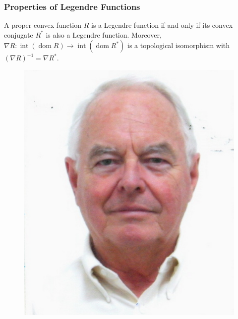 \documentclass[aspectratio=169,xcolor=dvipsnames,11pt]{beamer}
\begin{document}
\begin{frame}\frametitle{Properties of Legendre Functions}


\begin{minipage}{0.7\textwidth}
\begin{theorem}[Rockafellar (1967)]
\label{thm:Rockafellar}
A proper convex function $R$ is a Legendre function if and only if its convex conjugate $R^\ast$ is also a Legendre function.
Moreover, $\nabla R \colon \operatorname{int}(\operatorname{dom} R) \to \operatorname{int}(\operatorname{dom} R^*)$ is a topological isomorphism with $(\nabla R)^{-1} = \nabla R^\ast$.
\end{theorem}
\end{minipage}\hfill
\begin{minipage}{0.3\linewidth}
 \centering
 \begin{figure}
  \centering\vspace{1ex}
  \begin{minipage}[b]{0.6\textwidth}
    \includegraphics[width=\linewidth]{figures/rtr.jpg}
  \end{minipage}%
  \end{figure}
  \end{minipage}


\end{frame}
\end{document}
